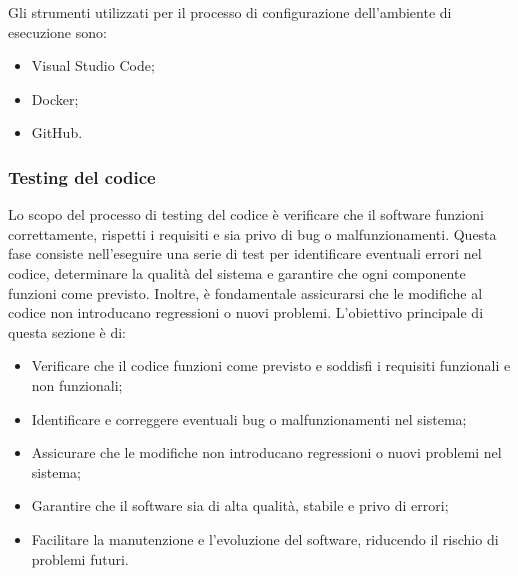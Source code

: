 Gli strumenti utilizzati per il processo di configurazione dell'ambiente di esecuzione sono:
\begin{itemize}
    \item Visual Studio Code;
    \item Docker;
    \item GitHub.
\end{itemize}

\subsubsection{Testing del codice}
Lo scopo del processo di testing del codice è verificare che il software funzioni correttamente, rispetti i requisiti e sia privo di bug o malfunzionamenti. Questa fase consiste nell'eseguire una serie di test per identificare eventuali errori nel codice, determinare la qualità del sistema e garantire che ogni componente funzioni come previsto. Inoltre, è fondamentale assicurarsi che le modifiche al codice non introducano regressioni o nuovi problemi. L'obiettivo principale di questa sezione è di:
\begin{itemize}
    \item Verificare che il codice funzioni come previsto e soddisfi i requisiti funzionali e non funzionali;
    \item Identificare e correggere eventuali bug o malfunzionamenti nel sistema;
    \item Assicurare che le modifiche non introducano regressioni o nuovi problemi nel sistema;
    \item Garantire che il software sia di alta qualità, stabile e privo di errori;
    \item Facilitare la manutenzione e l'evoluzione del software, riducendo il rischio di problemi futuri.
\end{itemize}

